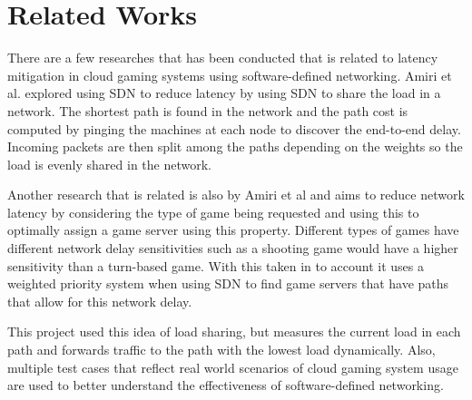 \section{Related Works}
There are a few researches that has been conducted that is related to latency mitigation in cloud gaming systems using software-defined networking. Amiri et al. \cite{amiri2015sdn1} explored using SDN to reduce latency by using SDN to share the load in a network. The shortest path is found in the network and the path cost is computed by pinging the machines at each node to discover the end-to-end delay. Incoming packets are then split among the paths depending on the weights so the load is evenly shared in the network.
\newline
\par
Another research that is related is also by Amiri et al \cite{amiri2015sdn2} and aims to reduce network latency by considering the type of game being requested and using this to optimally assign a game server using this property. Different types of games have different network delay sensitivities such as a shooting game would have a higher sensitivity than a turn-based game. With this taken in to account it uses a weighted priority system when using SDN to find game servers that have paths that allow for this network delay.
\newline
\par
This project used this idea of load sharing, but measures the current load in each path and forwards traffic to the path with the lowest load dynamically. Also, multiple test cases that reflect real world scenarios of cloud gaming system usage are used to better understand the effectiveness of software-defined networking.